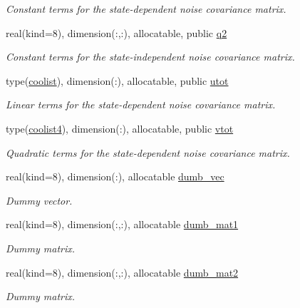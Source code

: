\begin{DoxyCompactItemize}
\begin{DoxyCompactList}\small\item\em Constant terms for the state-\/dependent noise covariance matrix. \end{DoxyCompactList}\item 
real(kind=8), dimension(\+:,\+:), allocatable, public \hyperlink{namespacemtv__int__tensor_a83f1ba468ee4599801c226c93115bad3}{q2}
\begin{DoxyCompactList}\small\item\em Constant terms for the state-\/independent noise covariance matrix. \end{DoxyCompactList}\item 
type(\hyperlink{structtensor_1_1coolist}{coolist}), dimension(\+:), allocatable, public \hyperlink{namespacemtv__int__tensor_a4a2acf9c88ba182967568ecfdd2eae0a}{utot}
\begin{DoxyCompactList}\small\item\em Linear terms for the state-\/dependent noise covariance matrix. \end{DoxyCompactList}\item 
type(\hyperlink{structtensor_1_1coolist4}{coolist4}), dimension(\+:), allocatable, public \hyperlink{namespacemtv__int__tensor_a35e35414488bc119d9604ada011cc842}{vtot}
\begin{DoxyCompactList}\small\item\em Quadratic terms for the state-\/dependent noise covariance matrix. \end{DoxyCompactList}\item 
real(kind=8), dimension(\+:), allocatable \hyperlink{namespacemtv__int__tensor_a192990600ca27522b2027f6c927572f7}{dumb\+\_\+vec}
\begin{DoxyCompactList}\small\item\em Dummy vector. \end{DoxyCompactList}\item 
real(kind=8), dimension(\+:,\+:), allocatable \hyperlink{namespacemtv__int__tensor_a6b350b05230b163e36094160758f2ee8}{dumb\+\_\+mat1}
\begin{DoxyCompactList}\small\item\em Dummy matrix. \end{DoxyCompactList}\item 
real(kind=8), dimension(\+:,\+:), allocatable \hyperlink{namespacemtv__int__tensor_a3c9c33307f4589ac4fecf901333721fd}{dumb\+\_\+mat2}
\begin{DoxyCompactList}\small\item\em Dummy matrix. \end{DoxyCompactList}\item 

\end{DoxyCompactItemize}
